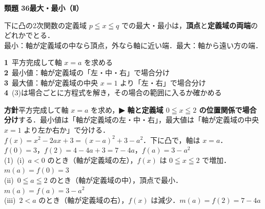 \documentclass[a4paper,11pt]{ltjsarticle}
\newcommand{\ans}[2]{\Needspace{5\baselineskip}\vspace{6pt}%
  {\sffamily\bfseries 類題 #1\quad #2}\par}
\newcommand{\point}[1]{\textsf{\bfseries ▶ #1}}
\begin{document}
\ans{36}{最大・最小（Ⅱ）}
\begin{kai}
\begin{kakunin}
下に凸の2次関数の定義域 $p\leqq x\leqq q$ での最大・最小は，\textbf{頂点}と\textbf{定義域の両端}のどれかでとる．\\
最小：軸が定義域の中なら頂点，外なら軸に近い端．\quad 最大：軸から遠い方の端．
\end{kakunin}
\begin{steps}
\textbf{1}\ 平方完成して軸 $x=a$ を求める\\
\textbf{2}\ 最小値：軸が定義域の「左・中・右」で場合分け\\
\textbf{3}\ 最大値：軸が定義域の中央 $x=1$ より「左・右」で場合分け\\
\textbf{4}\ (3)は場合ごとに方程式を解き，その場合の範囲に入るか確かめる
\end{steps}
\textbf{方針}\quad 平方完成して軸 $x=a$ を求め，\point{軸と定義域 $0\leqq x\leqq2$ の位置関係で場合分け}する．最小値は「軸が定義域の左・中・右」，最大値は「軸が定義域の中央 $x=1$ より左か右か」で分ける．\\[2pt]
$f(x)=x^2-2ax+3=(x-a)^2+3-a^2$．下に凸で，軸は $x=a$．\\
$f(0)=3$，\quad $f(2)=4-4a+3=7-4a$，\quad $f(a)=3-a^2$\\[2pt]
(1)\ (i)\ $a<0$ のとき（軸が定義域の左），$f(x)$ は $0\leqq x\leqq2$ で増加．\quad $m(a)=f(0)=3$\\
\hspace*{1.5em}(ii)\ $0\leqq a\leqq2$ のとき（軸が定義域の中），頂点で最小．\quad $m(a)=f(a)=3-a^2$\\
\hspace*{1.5em}(iii)\ $2<a$ のとき（軸が定義域の右），$f(x)$ は減少．\quad $m(a)=f(2)=7-4a$\\[2pt]
\begin{center}
\hspace{1.2em}

\end{center}
\end{kai}
\end{document}
